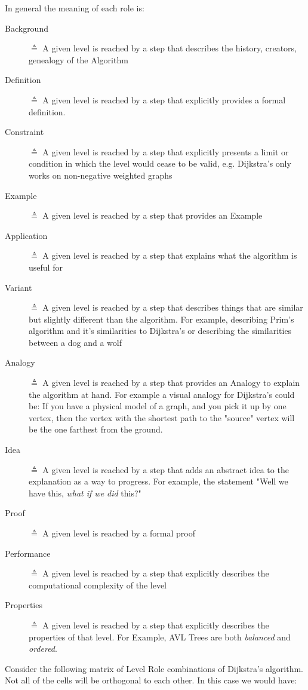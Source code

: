 \documentclass[10pt, letterpaper]{article}
\begin{document}
In general the meaning of each role is:
\begin{description}
\item[{Background}] \(\triangleq\) A given level is reached by a step that describes the history,
creators, genealogy of the Algorithm
\item[{Definition}] \(\triangleq\) A given level is reached by a step that explicitly provides a
formal definition.
\item[{Constraint}] \(\triangleq\) A given level is reached by a step that explicitly presents a
limit or condition in which the level would cease to be valid, e.g.
Dijkstra's only works on non-negative weighted graphs
\item[{Example}] \(\triangleq\) A given level is reached by a step that provides an Example
\item[{Application}] \(\triangleq\) A given level is reached by a step that explains what the
algorithm is useful for
\item[{Variant}] \(\triangleq\) A given level is reached by a step that describes things that are
similar but slightly different than the algorithm. For example, describing
Prim's algorithm and it's similarities to Dijkstra's or describing the
similarities between a dog and a wolf
\item[{Analogy}] \(\triangleq\) A given level is reached by a step that provides an Analogy to
explain the algorithm at hand. For example a visual analogy for Dijkstra's
could be: If you have a physical model of a graph, and you pick it up by
one vertex, then the vertex with the shortest path to the "source" vertex
will be the one farthest from the ground.
\item[{Idea}] \(\triangleq\) A given level is reached by a step that adds an abstract idea to the
explanation as a way to progress. For example, the statement "Well we have
this, \emph{what if we did} this?"
\item[{Proof}] \(\triangleq\) A given level is reached by a formal proof
\item[{Performance}] \(\triangleq\) A given level is reached by a step that explicitly describes
the computational complexity of the level
\item[{Properties}] \(\triangleq\) A given level is reached by a step that explicitly describes the properties of that level. For Example, AVL Trees are both \emph{balanced} and \emph{ordered}.
\end{description}

Consider the following matrix of Level Role combinations of Dijkstra's
algorithm. Not all of the cells will be orthogonal to each other. In this case
we would have: \\
\end{document}
